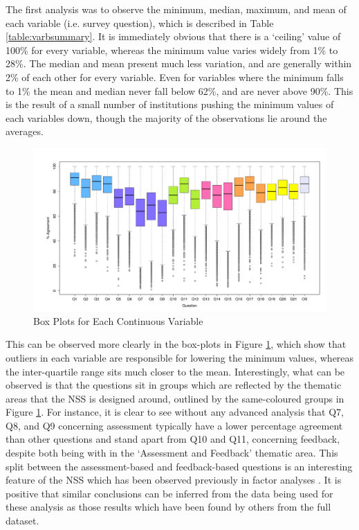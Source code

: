 \documentclass[11pt,a4paper]{report}
\begin{document}
The first analysis was to observe the minimum, median, maximum, and mean of each variable (i.e. survey question), which is described in Table \ref{table:varbsummary}. It is immediately obvious that there is a `ceiling' value of 100\% for every variable, whereas the minimum value varies widely from 1\% to 28\%. The median and mean present much less variation, and are generally within 2\% of each other for every variable. Even for variables where the minimum falls to 1\% the mean and median never fall below 62\%, and are never above 90\%. This is the result of a small number of institutions pushing the minimum values of each variables down, though the majority of the observations lie around the averages.

\begin{figure}[H]
	\includegraphics[width=1\linewidth]{images/boxplot.pdf}
	\caption{Box Plots for Each Continuous Variable}
\label{fig:boxplots}
\end{figure}


This can be observed more clearly in the box-plots in Figure \ref{fig:boxplots}, which show that outliers in each variable are responsible for lowering the minimum values, whereas the inter-quartile range sits much closer to the mean. Interestingly, what can be observed is that the questions sit in groups which are reflected by the thematic areas that the \ac{NSS} is designed around, outlined by the same-coloured groups in Figure \ref{fig:boxplots}. For instance, it is clear to see without any advanced analysis that Q7, Q8, and Q9 concerning assessment typically have a lower percentage agreement than other questions and stand apart from Q10 and Q11, concerning feedback, despite both being with in the `Assessment and Feedback' thematic area. This split between the assessment-based and feedback-based questions is an interesting feature of the NSS which has been observed previously in factor analyses \cite{HEFCEdata, marshandcheng2008}. It is positive that similar conclusions can be inferred from the data being used for these analysis as those results which have been found by others from the full dataset. 
\end{document}
